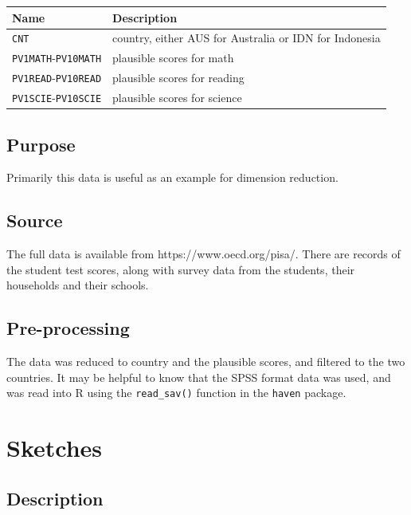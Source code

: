 \documentclass[
  letterpaper,
]{krantz}
\begin{document}
\begin{longtable}[]{@{}ll@{}}
\toprule\noalign{}
Name & Description \\
\midrule\noalign{}
\endhead
\bottomrule\noalign{}
\endlastfoot
\texttt{CNT} & country, either AUS for Australia or IDN for Indonesia \\
\texttt{PV1MATH}-\texttt{PV10MATH} & plausible scores for math \\
\texttt{PV1READ}-\texttt{PV10READ} & plausible scores for reading \\
\texttt{PV1SCIE}-\texttt{PV10SCIE} & plausible scores for science \\
\end{longtable}

\subsection*{Purpose}\label{purpose-4}

Primarily this data is useful as an example for dimension reduction.

\subsection*{Source}\label{source-4}

The full data is available from https://www.oecd.org/pisa/. There are
records of the student test scores, along with survey data from the
students, their households and their schools.

\subsection*{Pre-processing}\label{pre-processing-4}

The data was reduced to country and the plausible scores, and filtered
to the two countries. It may be helpful to know that the SPSS format
data was used, and was read into R using the \texttt{read\_sav()}
function in the \texttt{haven} package.

\section{Sketches}\label{sketches}

\subsection*{Description}\label{description-5}
\end{document}

